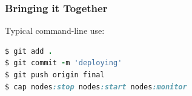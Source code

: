 \documentclass[t,handout]{beamer}
\begin{document}
\begin{frame}[fragile]
\frametitle{Bringing it Together}
Typical command-line use:
\begin{lstlisting}[frame=none,
  language=Ruby,
  basicstyle=\scriptsize\ttfamily\color{black},
  commentstyle=\scriptsize\ttfamily\color{red},
  stringstyle=\scriptsize\ttfamily\color{black}]
$ git add .
$ git commit -m 'deploying'
$ git push origin final
$ cap nodes:stop nodes:start nodes:monitor  
\end{lstlisting}

\end{frame}
\end{document}
